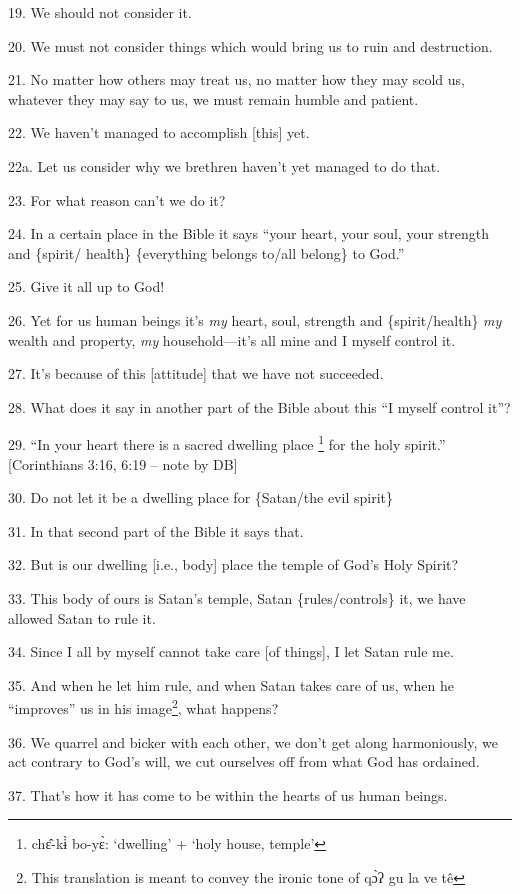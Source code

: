 19. We should not consider it.

20. We must not consider things which would bring us to ruin and destruction.

21. No matter how others may treat us, no matter how they may scold us, whatever
they may say to us, we must remain humble and patient.

22. We haven't managed to accomplish [this] yet.

22a. Let us consider why we brethren haven't yet managed to do that.

23. For what reason can't we do it?

24. In a certain place in the Bible it says ``your heart, your soul, your strength
and \{spirit/ health\} \{everything belongs to/all belong\} to God.''

25. Give it all up to God!

26. Yet for us human beings it's \textit{my} heart, soul, strength and \{spirit/health\}
\textit{my} wealth and property, \textit{my }household---it's all mine and I myself
control it.

27. It's because of this [attitude] that we have not succeeded.

28. What does it say in another part of the Bible about this ``I myself control
it''?

29. ``In your heart there is a sacred dwelling place \footnote{chɛ̂-kɨ̀ bo-yɛ̀: `dwelling' + `holy house, temple'} for the holy spirit.''
[Corinthians 3:16, 6:19 -- note by DB]

30. Do not let it be a dwelling place for \{Satan/the evil spirit\}

31. In that second part of the Bible it says that.

32. But is our dwelling [i.e., body] place the temple of God's Holy Spirit?

33. This body of ours is Satan's temple, Satan \{rules/controls\} it, we have allowed
Satan to rule it.

34. Since I all by myself cannot take care [of things], I let Satan rule me.

35. And when he let him rule, and when Satan takes care of us, when he ``improves''
us in his image\footnote{This translation is meant to convey the ironic tone of qɔ̀ʔ gu la ve tê}, what happens?

36. We quarrel and bicker with each other, we don't get along harmoniously, we
act contrary to God's will, we cut ourselves off from what God has ordained.

37. That's how it has come to be within the hearts of us human beings.


